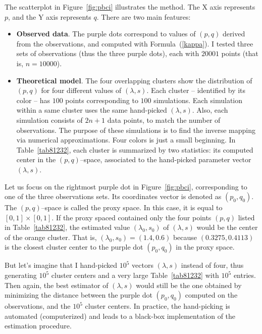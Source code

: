 \documentclass[10pt]{article}
\begin{document}
\noindent The scatterplot in Figure~\ref{fig:pbci} illustrates the method. The X axis represents $p$, and the Y axis represents $q$. There are two main features:
\begin{itemize}
\item {\bf Observed data}. The purple dots correspond to values of $(p,q)$ derived from the observations, and 
 computed with Formula~(\ref{kappa}). I tested three sets of observations (thus the three purple dots), each with $\num{20001}$ points (that is, $n=\num{10000}$). 

\item {\bf Theoretical model}. The four overlapping clusters show the distribution of $(p,q)$ for four different values
of $(\lambda,s)$. Each cluster -- identified by its color -- has $100$ points corresponding to $100$ simulations. Each simulation within a same cluster uses 
the same hand-picked $(\lambda,s)$. Also, each  simulation consists of $2n+1$ data points, to match the number of observations. The purpose of these simulations is to find the inverse mapping via numerical approximations. Four colors is just a small beginning. In  Table~\ref{tab81232}, each cluster is summarized by two statistics: its computed center in the $(p,q)$--space, associated to the hand-picked parameter vector $(\lambda,s)$.
\end{itemize}

\noindent Let us focus on the rightmost purple dot in Figure~\ref{fig:pbci}, corresponding to one of the three observations sets. Its coordinates vector 
 is denoted as $(p_0,q_0)$.
The $(p,q)$--space is called the \textcolor{index}{proxy space}. In this case, it is equal to $[0,1]\times [0,1]$. If
the proxy spaced contained only the four points $(p,q)$ listed in Table~\ref{tab81232}, the estimated value $(\lambda_0,s_0)$ of $(\lambda,s)$ would be the center of the orange cluster.  That is, $(\lambda_0,s_0)=(1.4, 0.6)$ because $(0.3275,0.4113)$  is the closest cluster center to the purple dot $(p_0,q_0)$ in the proxy space. 

But let's imagine that I hand-picked $10^5$ vectors $(\lambda,s)$ instead of four, thus generating $10^5$ cluster centers and a very large Table~\ref{tab81232} with $10^5$ entries. Then again, the best estimator of $(\lambda,s)$ would still  
be the one obtained by minimizing the distance between the purple dot $(p_0,q_0)$ computed on the observations, and the $10^5$ cluster centers. In practice, the hand-picking is automated 
(computerized) and leads to a 
black-box implementation of the estimation procedure. 
\end{document}
